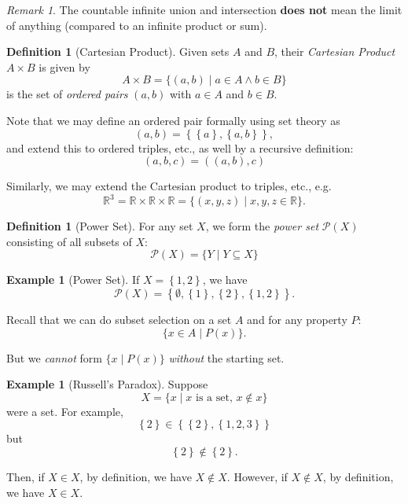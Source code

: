 \documentclass{article}
\theoremstyle{definition}
\newtheorem{definition}[theorem]{Definition}
\newtheorem{example}[theorem]{Example}
\theoremstyle{remark}
\newtheorem{remark}[theorem]{Remark}
\newcommand{\pqty}[1]{\left(#1\right)}
\newcommand{\Bqty}[1]{\left\{#1\right\}}
\newcommand{\set}[2]{\{#1\mid #2\}}
\newcommand{\powerset}{\mathcal{P}}
\newcommand{\RR}{\mathbb{R}}
\begin{document}
\begin{remark}
    The countable infinite union and intersection \textbf{does not} mean the limit of anything (compared to an infinite product or sum).
\end{remark}

\begin{definition}[Cartesian Product]
    Given sets \(A\) and \(B\), their \emph{Cartesian Product} \(A \times B\) is given by
    \[
        A \times B = \set{\pqty{a, b}}{a \in A \land b \in B}
    \]
    is the set of \emph{ordered pairs} \(\pqty{a, b}\) with \(a \in A\) and \(b \in B\).
\end{definition}

Note that we may define an ordered pair formally using set theory as
\[
    \pqty{a, b} = \Bqty{\Bqty{a}, \Bqty{a, b}},
\]
and extend this to ordered triples, etc., as well by a recursive definition:
\[
    \pqty{a, b, c} = \pqty{\pqty{a, b}, c}
\]

Similarly, we may extend the Cartesian product to triples, etc., e.g.
\[
    \RR^3 = \RR \times \RR \times \RR = \set{\pqty{x, y, z}}{x, y, z \in \RR}.
\]

\begin{definition}[Power Set]
    For any set \(X\), we form the \emph{power set} \(\powerset\pqty{X}\) consisting of all subsets of \(X\):
    \[
        \powerset\pqty{X} = \set{Y}{Y \subseteq X}
    \]
\end{definition}

\begin{example}[Power Set]
    If \(X = \Bqty{1, 2}\), we have
    \[
        \powerset\pqty{X} = \Bqty{\emptyset, \Bqty{1}, \Bqty{2}, \Bqty{1, 2}}.
    \]
\end{example}

Recall that we can do subset selection on a set \(A\) and for any property \(P\):
\[
    \set{x \in A}{P\pqty{x}}.
\]

But we \emph{cannot} form \(\set{x}{P\pqty{x}}\) \emph{without} the starting set.

\begin{example}[Russell's Paradox]
    Suppose
    \[
        X = \set{x}{x\text{ is a set, } x \notin x}
    \]  
    were a set. For example,
    \[
        \Bqty{2} \in \Bqty{\Bqty{2}, \Bqty{1, 2, 3}}
    \]
    but
    \[
        \Bqty{2} \notin \Bqty{2}.
    \]

    Then, if \(X \in X\), by definition, we have \(X \notin X\). However, if \(X \notin X\), by definition, we have \(X \in X\).
\end{example}
\end{document}
